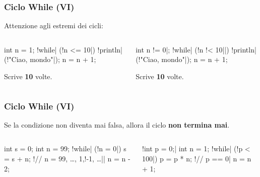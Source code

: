 \begin{frame}[fragile]\frametitle{Ciclo While (VI)}
  Attenzione agli estremi dei cicli:
  \begin{columns}[T]
    \begin{column}[T]{5cm}
      \begin{JavaCodePlain}[commandchars=\\!|]
	int n = 1;
	\Word!while| (\Green!n <= 10|) {
	  \Word!println|(\String!"Ciao, mondo\bang"|); 
	  n = n + 1; 
	}
      \end{JavaCodePlain}
      Scrive \texttt{} \textbf{10} volte.
    \end{column}
    \begin{column}[T]{5cm}
      \begin{JavaCodePlain}[commandchars=\\!|]
	int n \Red!= 0|;
	\Word!while| (\Green!n \Red!< 10||) {
	  \Word!println|(\String!"Ciao, mondo\bang"|); 
	  n = n + 1; 
	}
      \end{JavaCodePlain}
      Scrive \texttt{} \textbf{10} volte.
    \end{column}
  \end{columns}
\end{frame}

\begin{frame}[fragile]\frametitle{Ciclo While (VI)}
  Se la condizione non diventa mai falsa, allora il ciclo \textbf{non termina mai}.
  \begin{columns}[T]
    \begin{column}[T]{5cm}
      \begin{JavaCodePlain}[commandchars=\\!|]
	int s = 0;
	int n = 99;
	\Word!while| (\Green!n \bang= 0|) {
	  s = s + n; 
	  \Green!// n = 99, \dots, 1,\Red!-1, \dots||
	  n = n - 2; 
	}
      \end{JavaCodePlain}
    \end{column}
    \begin{column}[T]{5cm}
      \begin{JavaCodePlain}[commandchars=\\!|]
	\Red!int p = 0;|
	int n = 1;
	\Word!while| (\Green!p < 100|) {
	  p = p * n; \Green!// p == 0|
	  n = n + 1;
	}
      \end{JavaCodePlain}
    \end{column}
  \end{columns}
\end{frame}

